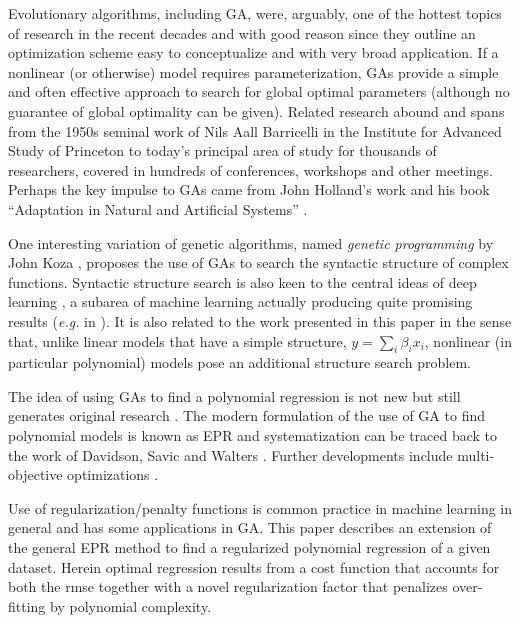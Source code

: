 \documentclass[review,preprint]{elsarticle}
\begin{document}
Evolutionary algorithms, including \ac{GA}, were, arguably, one of the hottest topics of research in the recent decades and with good reason since they outline an optimization scheme easy to conceptualize and with very broad application. If a nonlinear (or otherwise) model requires parameterization, \acp{GA} provide a simple and often effective approach to search for global optimal parameters (although no guarantee of global optimality can be given). Related research abound and spans from the 1950s seminal work of Nils Aall Barricelli \citep{Barricelli:1962aa} in the Institute for Advanced Study of Princeton to today's principal area of study for thousands of researchers, covered in hundreds of conferences, workshops and other meetings. Perhaps the key impulse to \acp{GA} came from John Holland's work and his book ``Adaptation in Natural and Artificial Systems'' \citep{Holland:1975aa}. 

One interesting variation of genetic algorithms, named \emph{genetic programming} by John Koza \citep{Koza:1992aa}, proposes the use of \acp{GA} to search the syntactic structure of complex functions. Syntactic structure search is also keen to the central ideas of deep learning \citep{Bengio:2009aa,Bengio:2013aa}, a subarea of machine learning actually producing quite promising results (\emph{e.g.} in \cite{Tarlow:2013fk}). It is also related to the work presented in this paper in the sense that, unlike linear models that have a simple structure, $y=\sum_i \beta_i x_i$, nonlinear (in particular polynomial) models pose an additional structure search problem.

The idea of using \acp{GA} to find a polynomial regression is not new \citep{Maertens:2006aa, Yu:2008aa, Wu:2009aa} but still generates original research \citep{Hofwing:2011aa,Cetisli:2011aa}. The modern formulation of the use of \ac{GA} to find polynomial models is known as \acf{EPR} and systematization can be traced back to the work of Davidson, Savic and Walters \cite{Davidson:2003aa}. Further developments include multi-objective optimizations \cite{Giustolisi:2009aa}. 

 Use of regularization/penalty functions is common practice in machine learning in general and has some applications in \ac{GA}\cite{Gupta2009275}. This paper describes an extension of the general \ac{EPR} method to find a regularized polynomial regression of a given dataset. Herein optimal regression results from a cost function that accounts for both the \ac{rmse} together with a novel regularization factor that penalizes over-fitting by polynomial complexity.
\end{document}
